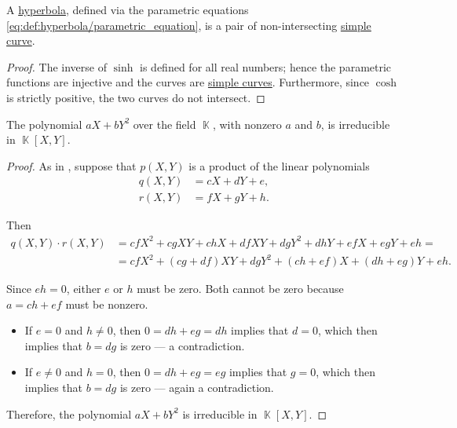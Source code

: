 \begin{proposition}\label{thm:hyperbola_is_closed_simple_curve}
  A \hyperref[def:hyperbola]{hyperbola}, defined via the parametric equations \eqref{eq:def:hyperbola/parametric_equation}, is a pair of non-intersecting \hyperref[def:parametric_curve/simple]{simple curve}.
\end{proposition}
\begin{proof}
  The inverse of \( \sinh \) is defined for all real numbers; hence the parametric functions are injective and the curves are \hyperref[def:parametric_curve/simple]{simple curves}. Furthermore, since \( \cosh \) is strictly positive, the two curves do not intersect.
\end{proof}

\begin{lemma}\label{thm:y2_minus_x_irreducible}
  The polynomial \( a X + b Y^2 \) over the field \( \BbbK \), with nonzero \( a \) and \( b \), is irreducible in \( \BbbK[X, Y] \).
\end{lemma}
\begin{proof}
  As in , suppose that \( p(X, Y) \) is a product of the linear polynomials
  \begin{align*}
    q(X, Y) &= c X + d Y + e, \\
    r(X, Y) &= f X + g Y + h.
  \end{align*}

  Then
  \begin{align*}
    q(X, Y) \cdot r(X, Y)
    &=
    cf X^2 + cg XY + ch X + df XY + dg Y^2 + dh Y + ef X + eg Y + eh
    = \\ &=
    cf X^2 + (cg + df) XY + dg Y^2 + (ch + ef) X + (dh + eg) Y + eh.
  \end{align*}

  Since \( eh = 0 \), either \( e \) or \( h \) must be zero. Both cannot be zero because \( a = ch + ef \) must be nonzero.
  \begin{itemize}
    \item If \( e = 0 \) and \( h \neq 0 \), then \( 0 = dh + eg = dh \) implies that \( d = 0 \), which then implies that \( b = dg \) is zero --- a contradiction.

    \item If \( e \neq 0 \) and \( h = 0 \), then \( 0 = dh + eg = eg \) implies that \( g = 0 \), which then implies that \( b = dg \) is zero --- again a contradiction.
  \end{itemize}

  Therefore, the polynomial \( a X + b Y^2 \) is irreducible in \( \BbbK[X, Y] \).
\end{proof}

